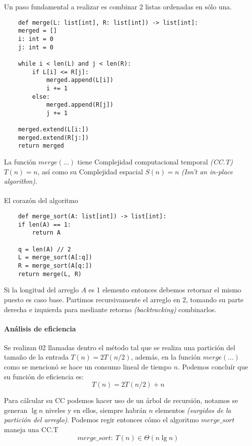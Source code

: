 \documentclass[tikz,11pt,fleqn]{book} %
\begin{document}
Un paso fundamental a realizar es combinar 2 listas ordenadas en sólo una.
\begin{lstlisting}
    def merge(L: list[int], R: list[int]) -> list[int]:
    merged = []
    i: int = 0
    j: int = 0

    while i < len(L) and j < len(R):
        if L[i] <= R[j]:
            merged.append(L[i])
            i += 1
        else:
            merged.append(R[j])
            j += 1

    merged.extend(L[i:])
    merged.extend(R[j:])
    return merged
\end{lstlisting}
La función $merge(...)$ tiene Complejidad computacional temporal \textit{(CC.T)} $T(n)=n$, así como su Complejidad espacial $S(n)=n$ \textit{(Isn't an in-place algorithm)}.
\\\\
El corazón del algoritmo
\begin{lstlisting}
    def merge_sort(A: list[int]) -> list[int]:
    if len(A) == 1:
        return A

    q = len(A) // 2
    L = merge_sort(A[:q])
    R = merge_sort(A[q:])
    return merge(L, R)
\end{lstlisting}
Si la longitud del arreglo $A$ es 1 elemento entonces debemos retornar el mismo puesto es caso base.
Partimos recursivamente el arreglo en 2, tomando su parte derecha e izquierda para mediante retorno \textit{(backtracking)} combinarlos.

\paragraph{Análisis de eficiencia}
Se realizan 02 llamadas dentro el método tal que se realiza una partición del tamaño de la entrada $T(n)=2T(n/2)$, además, en la función $merge(...)$ como se mencionó se hace un consumo lineal de tiempo $n$. Podemos concluír que su función de eficiencia es:
$$ T(n) = 2T(n/2)+n $$

Para cálcular su CC podemos hacer uso de un árbol de recursión, notamos se generan $\lg n$ niveles y en ellos, siempre habrán $n$ elementos \textit{(surgidos de la partición del arreglo)}. Podemos regir entonces cómo el algoritmo $merge\_sort$ maneja una CC.T
$$ merge\_sort:~T(n)\in \Theta(n\lg n) $$
\end{document}
